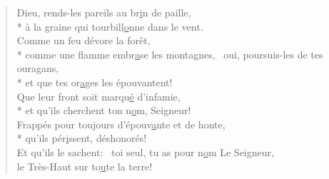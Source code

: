 \begin{verse}
Dieu, rends-les pareils au br\underline{i}n de paille, \\*
à la graine qui tourbill\underline{o}nne dans le vent. \\
Comme un feu dévore la forêt, \\*
comme une flamme embr\underline{a}se les montagnes,~\psalmstar
{}oui, poursuis-les de tes ouragans, \\*
et que tes or\underline{a}ges les épouvantent! \\

Que leur front soit marqu\underline{é} d’infamie, \\*
et qu’ils cherchent ton n\underline{o}m, Seigneur! \\
Frappés pour toujours d’épouv\underline{a}nte et de honte, \\*
qu’ils pér\underline{i}ssent, déshonorés! \\

Et qu’ils le sachent:~\psalmdagger
toi seul, tu as pour n\underline{o}m Le Seigneur, \\
le Très-Haut sur to\underline{u}te la terre! \\
\end{verse}

